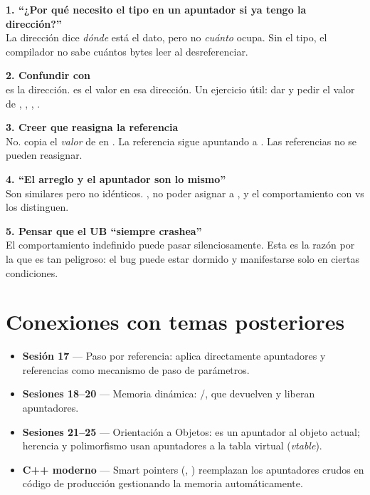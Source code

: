\documentclass[12pt, oneside]{article}
\begin{document}
\begin{notaprofesor}

\textbf{1. ``¿Por qué necesito el tipo en un apuntador si ya tengo la dirección?''}\\
La dirección dice \textit{dónde} está el dato, pero no \textit{cuánto} ocupa.
Sin el tipo, el compilador no sabe cuántos bytes leer al desreferenciar.

\vspace{0.6em}
\textbf{2. Confundir  con }\\
 es la dirección.  es el valor en esa dirección. Un ejercicio
útil: dar  y pedir el valor de , ,
, .

\vspace{0.6em}
\textbf{3. Creer que  reasigna la referencia}\\
No.  copia el \textit{valor} de  en . La referencia
sigue apuntando a . Las referencias no se pueden reasignar.

\vspace{0.6em}
\textbf{4. ``El arreglo y el apuntador son lo mismo''}\\
Son similares pero no idénticos. , no poder asignar a ,
y el comportamiento con  vs  los distinguen.

\vspace{0.6em}
\textbf{5. Pensar que el UB ``siempre crashea''}\\
El comportamiento indefinido puede pasar silenciosamente. Esta es la razón
por la que es tan peligroso: el bug puede estar dormido y manifestarse solo
en ciertas condiciones.

\end{notaprofesor}

\section{Conexiones con temas posteriores}

\begin{itemize}
  \item \textbf{Sesión 17} — Paso por referencia: aplica directamente
        apuntadores y referencias como mecanismo de paso de parámetros.
  \item \textbf{Sesiones 18--20} — Memoria dinámica: /,
        que devuelven y liberan apuntadores.
  \item \textbf{Sesiones 21--25} — Orientación a Objetos:  es un
        apuntador al objeto actual; herencia y polimorfismo usan apuntadores
        a la tabla virtual (\textit{vtable}).
  \item \textbf{C++ moderno} — Smart pointers (,
        ) reemplazan los apuntadores crudos en código de
        producción gestionando la memoria automáticamente.
\end{itemize}
\end{document}
